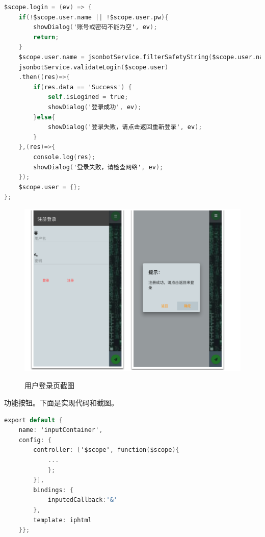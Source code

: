 \documentclass[bachelor,winfonts]{jnuthesis}
\begin{document}
\begin{lstlisting}[language=C]
$scope.login = (ev) => {
    if(!$scope.user.name || !$scope.user.pw){
    	showDialog('账号或密码不能为空', ev);
    	return;
    }
    $scope.user.name = jsonbotService.filterSafetyString($scope.user.name);
    jsonbotService.validateLogin($scope.user)
    .then((res)=>{
    	if(res.data == 'Success') {
    		self.isLogined = true;
    		showDialog('登录成功', ev);
    	}else{
    		showDialog('登录失败，请点击返回重新登录', ev);
    	}
    },(res)=>{
    	console.log(res);
    	showDialog('登录失败，请检查网络', ev);
    });
    $scope.user = {};
};
\end{lstlisting}


\begin{figure}[H]
  \centering
  \includegraphics[width= 1.0\textwidth]{login.png}\\
  \caption{用户登录页截图}\label{fig:pic8}
\end{figure}


功能按钮。下面是实现代码和截图。

\begin{lstlisting}[language=C]
export default {
	name: 'inputContainer', 
	config: {
		controller: ['$scope', function($scope){
			...
			};
		}],
		bindings: {
			inputedCallback:'&'
		},
		template: iphtml
	}};
\end{lstlisting}
\end{document}
